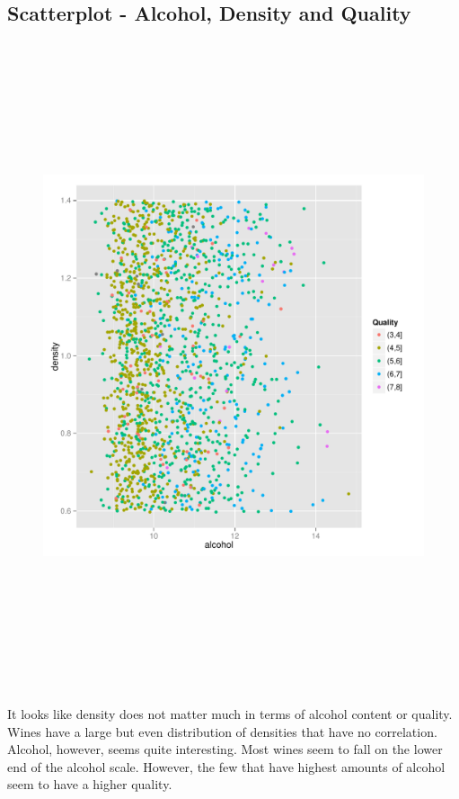 \documentclass[12pt,a4paper]{article}
\begin{document}
\begin{singlespace}
\newpage
\section{Scatterplot - Alcohol, Density and Quality}

\begin{figure}[h!]
	\hspace{-1cm}
    \centering
    \includegraphics[width=\textwidth, height=19cm, trim= 0 0 0 20]{alcoholVSdensity.pdf}
\end{figure}
\FloatBarrier
It looks like density does not matter much in terms of alcohol content or quality. 
Wines have a large but even distribution of densities that have no correlation. 
Alcohol, however, seems quite interesting. Most wines seem to fall on the lower end of the alcohol scale. However, the few that have highest amounts of alcohol seem to have a higher quality.


\end{singlespace}
\end{document}
